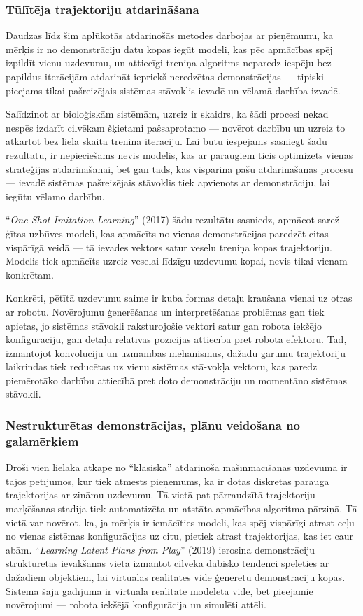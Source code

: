 \documentclass[12pt, a4paper]{article}
\numberwithin{equation}{section} %
\begin{document}
\subsubsection{Tūlītēja trajektoriju atdarināšana}

Daudzas līdz šim aplūkotās atdarinošās metodes darbojas ar pieņēmumu, ka mērķis ir no demonstrāciju datu kopas iegūt modeli, kas pēc apmācības spēj izpildīt vienu uzdevumu, un attiecīgi treniņa algoritms neparedz iespēju bez papildus iterācijām atdarināt iepriekš neredzētas demonstrācijas --- tipiski pieejams tikai pašreizējais sistēmas stāvoklis ievadē un vēlamā darbība izvadē.

Salīdzinot ar bioloģiskām sistēmām, uzreiz ir skaidrs, ka šādi procesi nekad nespēs izdarīt cilvēkam šķietami pašsaprotamo --- novērot darbību un uzreiz to atkārtot bez liela skaita treniņa iterāciju. Lai būtu iespējams sasniegt šādu rezultātu, ir nepieciešams nevis modelis, kas ar paraugiem ticis optimizēts vienas stratēģijas atdarināšanai, bet gan tāds, kas vispārina pašu atdarināšanas procesu --- ievadē sistēmas pašreizējais stāvoklis tiek apvienots ar demonstrāciju, lai iegūtu vēlamo darbību. 

``\textit{One-Shot Imitation Learning}'' \cite{duan2017one} (2017) šādu rezultātu sasniedz, apmācot sarež-ģītas uzbūves modeli, kas apmācīts no vienas demonstrācijas paredzēt citas vispārīgā veidā --- tā ievades vektors satur veselu treniņa kopas trajektoriju. Modelis tiek apmācīts uzreiz veselai līdzīgu uzdevumu kopai, nevis tikai vienam konkrētam.

Konkrēti, pētītā uzdevumu saime ir kuba formas detaļu kraušana vienai uz otras ar robotu. Novērojumu ģenerēšanas un interpretēšanas problēmas gan tiek apietas, jo sistēmas stāvokli raksturojošie vektori satur gan robota iekšējo konfigurāciju, gan detaļu relatīvās pozīcijas attiecībā pret robota efektoru. Tad, izmantojot konvolūciju un uzmanības mehānismus, dažādu garumu trajektoriju laikrindas tiek reducētas uz vienu sistēmas stā-vokļa vektoru, kas paredz piemērotāko darbību attiecībā pret doto demonstrāciju un momentāno sistēmas stāvokli.

\subsubsection{Nestrukturētas demonstrācijas, plānu veidošana no galamērķiem}

Droši vien lielākā atkāpe no ``klasiskā'' atdarinošā mašīnmācīšanās uzdevuma ir tajos pētījumos, kur tiek atmests pieņēmums, ka ir dotas diskrētas parauga trajektorijas ar zināmu uzdevumu. Tā vietā pat pārraudzītā trajektoriju marķēšanas stadija tiek automatizēta un atstāta apmācības algoritma pārziņā. Tā vietā var novērot, ka, ja mērķis ir iemācīties modeli, kas spēj vispārīgi atrast ceļu no vienas sistēmas konfigurācijas uz citu, pietiek atrast trajektorijas, kas iet caur abām. ``\textit{Learning Latent Plans from Play}'' \cite{lynch2020learning} (2019) ierosina demonstrāciju strukturētas ievākšanas vietā izmantot cilvēka dabisko tendenci spēlēties ar dažādiem objektiem, lai virtuālās realitātes vidē ģenerētu demonstrāciju kopas. Sistēma šajā gadījumā ir virtuālā realitātē modelēta vide, bet pieejamie novērojumi --- robota iekšējā konfigurācija un simulēti attēli.
\end{document}
